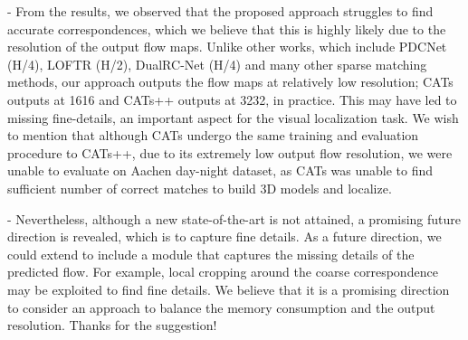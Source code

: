 \documentclass[11pt,draftclsnofoot,onecolumn]{IEEEtran}
\begin{document}
- From the results, we observed that the proposed approach struggles to find accurate correspondences, which we believe that this is highly likely due to the resolution of the output flow maps. Unlike other works, which include PDCNet (H/4), LOFTR (H/2), DualRC-Net (H/4) and many other sparse matching methods, our approach outputs the flow maps at relatively low resolution; CATs outputs at 1616 and CATs++ outputs at 3232, in practice. This may have led to missing fine-details, an important aspect for the visual localization task. We wish to mention that although CATs undergo the same training and evaluation procedure to CATs++, due to its extremely low output flow resolution, we were unable to evaluate on Aachen day-night dataset, as CATs was unable to find sufficient number of correct matches to build 3D models and localize.    

- Nevertheless, although a new state-of-the-art is not attained, a promising future direction is revealed, which is to capture fine details. As a future direction, we could extend to include a module that captures the missing details of the predicted flow. For example, local cropping around the coarse correspondence may be exploited to find fine details. We believe that it is a promising direction to consider an approach to balance the memory consumption and the output resolution.  Thanks for the suggestion!
\end{document}

